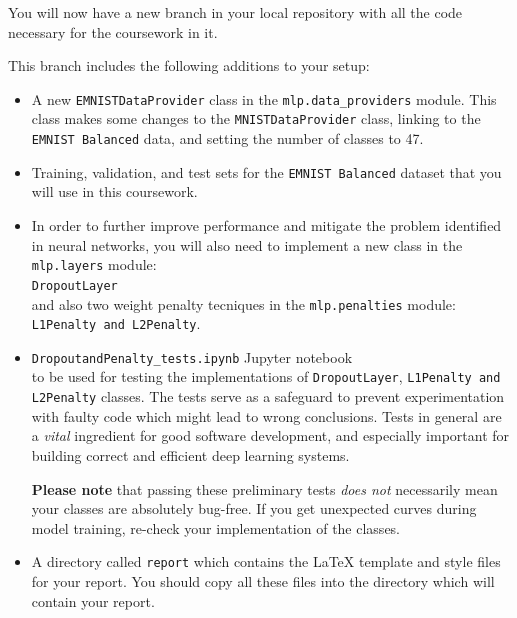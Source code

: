 \documentclass[11pt,]{article}
\begin{document}
You will now have a new branch in your local repository with all the code necessary for the coursework in it.   

This branch includes the following additions to your setup:

\begin{itemize}
	\item A new \texttt{EMNISTDataProvider} class in the \verb+mlp.data_providers+ module.
	This class makes some changes to the \texttt{MNISTDataProvider} class, linking to the \texttt{EMNIST Balanced} data, and setting the number of classes to 47.
	\item Training, validation, and test sets for the \texttt{EMNIST Balanced} dataset that
	you will use in this coursework.
	\item In order to further improve performance and mitigate the problem identified in neural networks, you will also need to implement a new class in the \verb+mlp.layers+ module:\\
 	\texttt{DropoutLayer}\\
 	and also two weight penalty tecniques in the \verb+mlp.penalties+ module:\\
	\texttt{L1Penalty and L2Penalty}. 
	\item \texttt{DropoutandPenalty\_tests.ipynb} Jupyter notebook\\
	to be used for testing the implementations of {\texttt{{DropoutLayer}}}, {\texttt{L1Penalty and L2Penalty}} classes. The tests serve as a safeguard to prevent experimentation with faulty code which might lead to wrong conclusions. Tests in general are a \emph{vital} ingredient for good software development, and especially important for building correct and  efficient deep learning systems. 
	
	\textbf{Please note} that passing these preliminary tests \textit{does not} necessarily mean your classes are absolutely bug-free. If you get unexpected curves during model training, re-check your implementation of the classes. 
	
	\item A directory called \texttt{report} which contains the LaTeX template and style files for your report.  You should copy all these files into the directory which will contain your report.
\end{itemize}



\newpage
\end{document}
